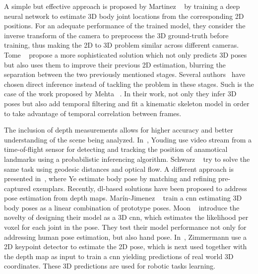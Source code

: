 A simple but effective approach is proposed by Martinez \etal~\cite{Martinez2017-su} by training a deep neural network to estimate 3D body joint locations from the corresponding 2D positions. For an adequate performance of the trained model, they consider the inverse transform of the camera to preprocess the 3D ground-truth before training, thus making the 2D to 3D problem similar across different cameras. Tome \etal~\cite{Tome2017-ja} propose a more sophisticated solution which not only predicts 3D poses but also uses them to improve their previous 2D estimation, blurring the separation between the two previously mentioned stages. Several authors~\cite{Nibali2019-yl, Luvizon2018-te, Pavlakos2017-qk, Nie2017-ud, Mehta2017-zi} have chosen direct inference instead of tackling the problem in these stages. Such is the case of the work proposed by Mehta \etal~\cite{Mehta2017-zi}. In their work, not only they infer 3D poses but also add temporal filtering and fit a kinematic skeleton model in order to take advantage of temporal correlation between frames.
 
The inclusion of depth measurements allows for higher accuracy and better understanding of the scene being analyzed. In~\cite{Youding_Zhu2008-pr}, Youding \etal use video stream from a time-of-flight sensor for detecting and tracking the position of anamotical landmarks using a probabilistic inferencing algorithm. Schwarz \etal~\cite{Schwarz2011-qi} try to solve the same task using geodesic distances and optical flow. A different approach is presented in~\cite{Ye2011-ui}, where Ye \etal estimate body pose by matching and refining pre-captured exemplars. Recently, \gls{dl}-based solutions have been proposed to address pose estimation from depth maps. Marín-Jimenez \etal~\cite{Marin-Jimenez2018-so} train a \gls{cnn} estimating 3D body poses as a linear combination of prototype poses. Moon \etal~\cite{Moon2018-xp} introduce the novelty of designing their model as a 3D \gls{cnn}, which estimates the likelihood per voxel for each joint in the pose. They test their model performance not only for addressing human pose estimation, but also hand pose. In~\cite{Zimmermann2018-sn}, Zimmermann \etal use a 2D keypoint detector to estimate the 2D pose, which is next used together with the depth map as input to train a \gls{cnn}  yielding predictions of real world 3D coordinates. These 3D predictions are used for robotic tasks learning.
